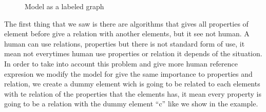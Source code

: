 \begin{figure}[ht]
\begin{minipage}[b]{0.5\linewidth}
\caption{Model as a labeled graph}
\label{GRE3D7-stimulus-graph}
\end{minipage}
\end{figure}



The first thing that we saw is there are algorithms that gives all properties of element before give a relation with another elements, but it see not human. A human can use relations, properties but there is not standard form of use, it mean not everytimes human use properties or relation it depends of the situation. In order to take into account this problem and give more human reference expresion we modify the model for give the same importance to properties and relation, we create a dummy element wich is going to be related to each elements with te relation of the properties that the elements has, it mean every property is going to be a relation with the dummy element ``c'' like we show in the example.


